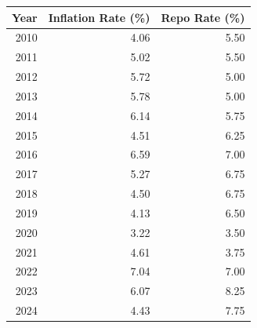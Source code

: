 \documentclass[11pt,preprint]{elsarticle}
\let\origtable\table
\let\endorigtable\endtable
\renewenvironment{table}[1][2] {
    \expandafter\origtable\expandafter[H]
} {
    \endorigtable
}
\numberwithin{equation}{section}
\numberwithin{figure}{section}
\numberwithin{table}{section}
\begin{document}
\begin{table}[H]
\centering
\begin{tabular}{rrr}
  \hline
Year & Inflation Rate (\%) & Repo Rate (\%) \\ 
  \hline
2010 & 4.06 & 5.50 \\ 
  2011 & 5.02 & 5.50 \\ 
  2012 & 5.72 & 5.00 \\ 
  2013 & 5.78 & 5.00 \\ 
  2014 & 6.14 & 5.75 \\ 
  2015 & 4.51 & 6.25 \\ 
  2016 & 6.59 & 7.00 \\ 
  2017 & 5.27 & 6.75 \\ 
  2018 & 4.50 & 6.75 \\ 
  2019 & 4.13 & 6.50 \\ 
  2020 & 3.22 & 3.50 \\ 
  2021 & 4.61 & 3.75 \\ 
  2022 & 7.04 & 7.00 \\ 
  2023 & 6.07 & 8.25 \\ 
  2024 & 4.43 & 7.75 \\ 
   \hline
\end{tabular}
\caption{Annual Inflation and Repo Rate in South Africa (2010–2024) \label{tab9}} 
\end{table}


\end{document}
